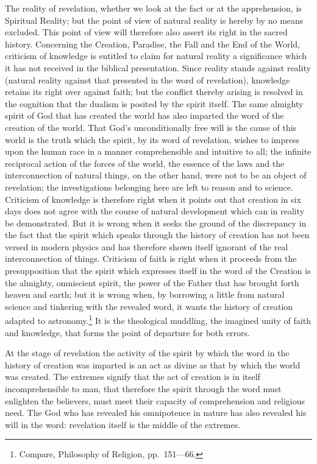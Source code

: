 \documentclass[12pt,a4paper,openany]{book}
\newcommand{\opage}[1]{\marginnote{\footnotesize\textit{[#1]}}}
\begin{document}
The reality of revelation, whether we look at the fact
or at the apprehension, is Spiritual Reality; but
the point of view of natural reality is hereby by no means
excluded. This point of view will therefore also assert its right
in the sacred history. Concerning the Creation, Paradise,
the Fall and the End of the World, criticism of knowledge is
entitled to claim for natural reality a significance
which it has not received in the biblical presentation.
Since reality stands against reality (natural reality
against that presented in the word of revelation),
knowledge retains its right over against faith; but the
conflict thereby arising is resolved in the cognition that
the dualism is posited by the spirit itself. The same almighty
spirit of God that has created the world has also imparted
the word of the creation of the world. That God's unconditionally free
will is the cause of this world is the truth which
the spirit, by its word of revelation, wishes to impress upon the human race
in a manner comprehensible and intuitive to all; the infinite
reciprocal action of the forces of the world, the essence of the laws
and the interconnection of natural things, on the other hand, were not to be
an object of revelation; the investigations belonging
\setcounter{footnote}{0}%
\opage{29}here are left to reason and to science. Criticism of knowledge
is therefore right when it points out
that creation in six days does not agree with the course of natural development
which can in reality be demonstrated.
But it is wrong when it seeks the ground of the discrepancy
in the fact that the spirit which speaks through
the history of creation has not been versed in modern physics
and has therefore shown itself ignorant of the real
interconnection of things. Criticism of faith is right when it proceeds
from the presupposition that the spirit which expresses itself in
the word of the Creation is the almighty, omniscient spirit,
the power of the Father that has brought forth heaven and earth;
but it is wrong when, by borrowing a little from
natural science and tinkering with the revealed word,
it wants the history of creation adapted to astronomy.\footnote[1]{Compare, Philosophy of Religion, pp.\ 151---66.} %
It is the theological muddling, the imagined unity
of faith and knowledge, that forms the point of departure for both
errors.

At the stage of revelation the activity of the spirit
by which the word in the history of creation was imparted is an act
as divine as that by which the world was
created. The extremes signify that the act of creation is in itself
incomprehensible to man, that therefore the spirit through the word must
enlighten the believers, must meet their capacity of comprehension and religious
need. The God who has revealed his omnipotence in nature has also revealed his will in
the word: revelation itself is the middle of the extremes.
\end{document}
